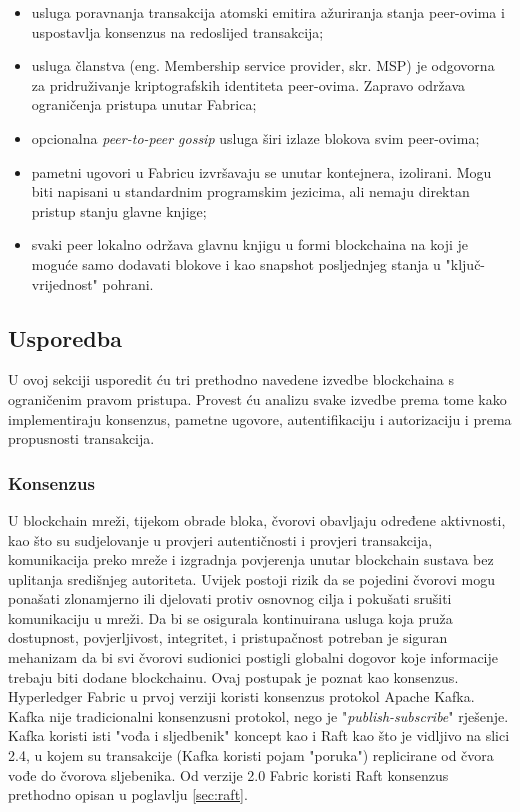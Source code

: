 \documentclass[times, utf8, diplomski]{fer}
\begin{document}
\begin{itemize}

\item usluga poravnanja transakcija atomski emitira ažuriranja stanja peer-ovima i uspostavlja konsenzus na redoslijed transakcija;

\item usluga članstva (eng. Membership service provider, skr. MSP) je odgovorna za pridruživanje kriptografskih identiteta peer-ovima. Zapravo održava ograničenja pristupa unutar Fabrica;

\item opcionalna \textit{peer-to-peer gossip} usluga širi izlaze blokova svim peer-ovima;

\item pametni ugovori u Fabricu izvršavaju se unutar kontejnera, izolirani. Mogu biti napisani u standardnim programskim jezicima, ali nemaju direktan pristup stanju glavne knjige;

\item svaki peer lokalno održava glavnu knjigu u formi blockchaina na koji je moguće samo dodavati blokove i kao snapshot posljednjeg stanja u "ključ-vrijednost" pohrani.

\end{itemize}

\subsection{Usporedba}

U ovoj sekciji usporedit ću tri prethodno navedene izvedbe blockchaina s ograničenim pravom pristupa. Provest ću analizu svake izvedbe prema tome kako implementiraju konsenzus, pametne ugovore, autentifikaciju i autorizaciju i prema propusnosti transakcija.

\subsubsection{Konsenzus}

U blockchain mreži, tijekom obrade bloka, čvorovi obavljaju određene aktivnosti, kao što su sudjelovanje u provjeri autentičnosti i provjeri transakcija, komunikacija preko mreže i izgradnja povjerenja unutar blockchain sustava bez uplitanja središnjeg autoriteta. Uvijek postoji rizik da se pojedini čvorovi mogu ponašati zlonamjerno ili djelovati protiv osnovnog cilja i pokušati srušiti komunikaciju u mreži. Da bi se osigurala kontinuirana usluga koja pruža dostupnost, povjerljivost, integritet, i pristupačnost potreban je siguran mehanizam da bi svi čvorovi sudionici postigli globalni dogovor koje
informacije trebaju biti dodane blockchainu. Ovaj postupak je poznat kao konsenzus.
Hyperledger Fabric u prvoj verziji koristi konsenzus protokol Apache Kafka. Kafka nije tradicionalni konsenzusni protokol, nego je "\textit{publish-subscribe}" rješenje. Kafka koristi isti "vođa i sljedbenik" koncept kao i Raft kao što je vidljivo na slici 2.4, u kojem su transakcije (Kafka koristi pojam "poruka") replicirane od čvora vođe do čvorova sljebenika. Od verzije 2.0 Fabric koristi Raft konsenzus prethodno opisan u poglavlju \ref{sec:raft}.
\end{document}
